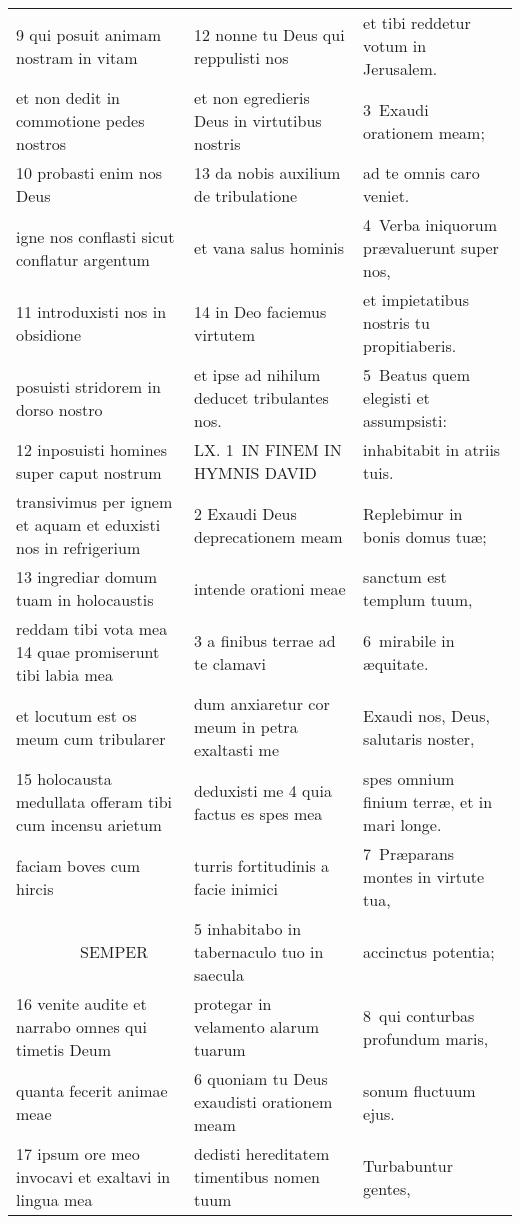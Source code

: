 \documentclass{article}
\begin{document}
\begin{longtable}{@{}p{}p{}p{}@{}}
9 qui posuit animam nostram in vitam	&	12 nonne tu Deus qui reppulisti nos	&	et tibi reddetur votum in Jerusalem.	\\
et non dedit in commotione pedes nostros	&	et non egredieris Deus in virtutibus nostris	&	3 Exaudi orationem meam;	\\
10 probasti enim nos Deus	&	13 da nobis auxilium de tribulatione	&	ad te omnis caro veniet.	\\
igne nos conflasti sicut conflatur argentum	&	et vana salus hominis	&	4 Verba iniquorum prævaluerunt super nos,	\\
11 introduxisti nos in obsidione	&	14 in Deo faciemus virtutem	&	et impietatibus nostris tu propitiaberis.	\\
posuisti stridorem in dorso nostro	&	et ipse ad nihilum deducet tribulantes nos.	&	5 Beatus quem elegisti et assumpsisti:	\\
12 inposuisti homines super caput nostrum	&	LX. 1 IN FINEM IN HYMNIS DAVID	&	inhabitabit in atriis tuis.	\\
transivimus per ignem et aquam et eduxisti nos in refrigerium	&	2 Exaudi Deus deprecationem meam	&	Replebimur in bonis domus tuæ;	\\
13 ingrediar domum tuam in holocaustis	&	intende orationi meae	&	sanctum est templum tuum,	\\
reddam tibi vota mea 14 quae promiserunt tibi labia mea	&	3 a finibus terrae ad te clamavi	&	6 mirabile in æquitate.	\\
et locutum est os meum cum tribularer	&	dum anxiaretur cor meum in petra exaltasti me	&	Exaudi nos, Deus, salutaris noster,	\\
15 holocausta medullata offeram tibi cum incensu arietum	&	deduxisti me 4 quia factus es spes mea	&	spes omnium finium terræ, et in mari longe.	\\
faciam boves cum hircis	&	turris fortitudinis a facie inimici	&	7 Præparans montes in virtute tua,	\\
    SEMPER	&	5 inhabitabo in tabernaculo tuo in saecula	&	accinctus potentia;	\\
16 venite audite et narrabo omnes qui timetis Deum	&	protegar in velamento alarum tuarum	&	8 qui conturbas profundum maris,	\\
quanta fecerit animae meae	&	6 quoniam tu Deus exaudisti orationem meam	&	sonum fluctuum ejus.	\\
17 ipsum ore meo invocavi et exaltavi in lingua mea	&	dedisti hereditatem timentibus nomen tuum	&	Turbabuntur gentes,	\\

\end{longtable}
\end{document}

